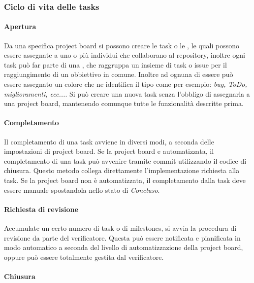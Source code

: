 \subsubsection{Ciclo di vita delle tasks}

	\paragraph{Apertura}

	Da una specifica project board si possono creare le task o le , le quali possono essere assegnate a uno o più individui che collaborano al repository, inoltre ogni task
	può far parte di una , che raggruppa un insieme di task o issue per il raggiungimento di un obbiettivo in comune. 
	Inoltre ad ognuna di essere può essere assegnato un colore che ne identifica il tipo come per esempio: \textit{bug, ToDo, miglioramenti, ecc...}. 
	Si può creare una nuova task senza l'obbligo di assegnarla a una project board, mantenendo comunque tutte le funzionalità descritte prima. 

	\paragraph{Completamento}

	Il completamento di una task avviene in diversi modi, a seconda delle impostazioni di project board. 
	Se la project board e automatizzata, il completamento di una task può avvenire tramite commit utilizzando il codice di chiusura. 
	Questo metodo collega direttamente l'implementazione richiesta alla task. 
	Se la project board non è automatizzata, il completamento dalla task deve essere manuale spostandola nello stato di \textit{Concluso}. 
	
	\paragraph{Richiesta di revisione}

	Accumulate un certo numero di task o di milestones, si avvia la procedura di revisione da parte del verificatore. Questa può essere notificata e pianificata in modo automatico
	a seconda del livello di automatizzazione della project board, oppure può essere totalmente gestita dal verificatore. 
	
	\paragraph{Chiusura}

